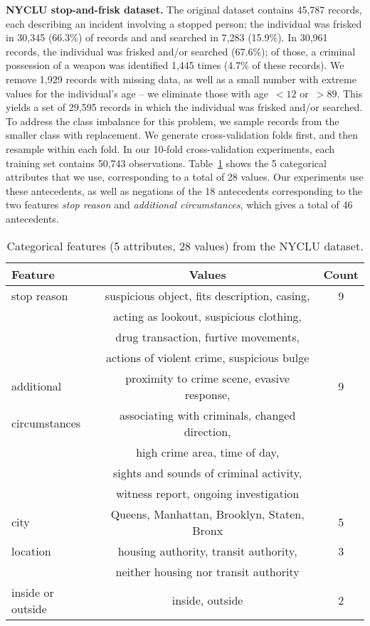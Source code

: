 \textbf{NYCLU stop-and-frisk dataset.} The original dataset contains 45,787 records,
each describing an incident involving a stopped person; the individual
was frisked in 30,345 (66.3\%) of records and and searched in 7,283 (15.9\%).
%
In 30,961 records, the individual was frisked and/or searched (67.6\%); of those,
a criminal possession of a weapon was identified 1,445 times (4.7\% of these records).
%
We remove 1,929 records with missing data, as well as a small number with extreme values
for the individual's age -- we eliminate those with age~${< 12}$ or~${>89}$.
%
This yields a set of 29,595 records in which the individual was frisked and/or searched.
%
To address the class imbalance for this problem, we sample records from the
smaller class with replacement.
%
We generate cross-validation folds first, and then resample within each fold.
%
In our 10-fold cross-validation experiments, each training set contains 50,743 observations.
%
Table~\ref{tab:frisk-data} shows the 5 categorical attributes that we use,
corresponding to a total of 28 values.
%
Our experiments use these antecedents,
as well as negations of the 18 antecedents corresponding to the two features
\emph{stop reason} and \emph{additional circumstances},
which gives a total of 46 antecedents.

\begin{table}[t!]
\centering
\begin{tabular}{l | c  c}
Feature & Values & Count \\
\hline
stop reason & suspicious object, fits description, casing, & 9 \\
& acting as lookout, suspicious clothing, & \\
& drug transaction, furtive movements, & \\
& actions of violent crime, suspicious bulge \\
\hline
additional & proximity to crime scene, evasive response,  & 9 \\
circumstances & associating with criminals, changed direction, & \\
& high crime area, time of day,  & \\
& sights and sounds of criminal activity, & \\
& witness report, ongoing investigation & \\
\hline
city & Queens,  Manhattan, Brooklyn, Staten, Bronx & 5 \\
\hline
location & housing authority, transit authority, & 3 \\
& neither housing nor transit authority & \\
\hline
inside or outside & inside, outside & 2 \\
\end{tabular}
\caption{Categorical features (5 attributes, 28 values) from the NYCLU dataset.}
\vspace{4mm}
\label{tab:frisk-data}
\end{table}

